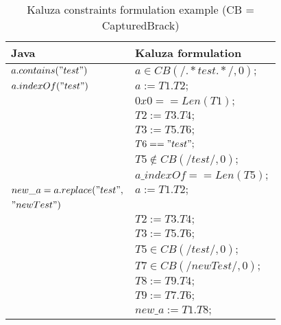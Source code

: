 \begin{table}[t]
   \centering
    \begin{tabular}{|l|l|}
      \hline
      \textbf{Java} & \textbf{Kaluza formulation}\\
      \hline
      $a.contains("test")$ & $a \in CB(/.*test.*/, 0);$ \\
      \hline
      $a.indexOf("test")$ & $a := T1 . T2;$ \\
                  & $0x0 == Len(T1);$ \\
                  & $T2 := T3 . T4;$ \\
                  & $T3 := T5 . T6;$ \\
                  & $T6 == "test";$ \\
                  & $T5 \notin CB(/test/, 0);$ \\
              & $a\_indexOf == Len(T5);$ \\
      \hline
      $new\_a = a.replace("test",$ & $a := T1 . T2;$ \\
       $"newTest")$ &  \\
                      & $T2 := T3 . T4;$ \\
                      & $T3 := T5 . T6;$ \\
                      & $T5 \in CB(/test/, 0);$ \\
                      & $T7 \in CB(/newTest/, 0);$ \\
                      & $T8 :=  T9 . T4;$ \\
                      & $T9 :=  T7 . T6;$ \\
                      & $new\_a := T1 . T8;$ \\
      \hline
    \end{tabular}
    \caption{Kaluza constraints formulation example (CB = CapturedBrack)}
    \label{table:tabkaluza}
  \end{table}

